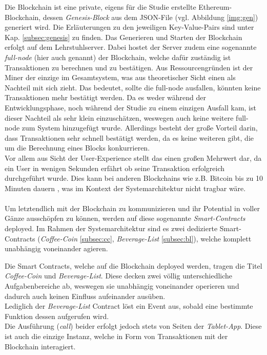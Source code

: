 Die Blockchain ist eine private, eigens für die Studie erstellte Ethereum-Blockchain, dessen \textit{Genesis-Block} aus dem JSON-File (vgl. Abbildung \ref{img:gen}) generiert wird. Die Erläuterungen zu den jeweiligen Key-Value-Pairs sind unter Kap. \ref{subsec:genesis} zu finden.
Das Generieren und Starten der Blockchain erfolgt auf dem Lehrstuhlserver.
Dabei hostet der Server zudem eine sogenannte \textit{full-node} (hier auch  genannt) der Blockchain, welche dafür zuständig ist Transaktionen zu berechnen und zu bestätigen.
Aus Ressourcengründen ist der Miner der einzige im Gesamtsystem, was aus theoretischer Sicht einen  als Nachteil mit sich zieht. Das bedeutet, sollte die full-node ausfallen, könnten keine Transaktionen mehr bestätigt werden. Da es weder während der Entwicklungsphase, noch während der Studie zu einem einzigen Ausfall kam, ist dieser Nachteil als sehr klein einzuschätzen, weswegen auch keine weitere full-node zum System hinzugefügt wurde. Allerdings besteht der große Vorteil darin, dass Transaktionen sehr schnell bestätigt werden, da es keine weiteren  gibt, die um die Berechnung eines Blocks konkurrieren. \\
Vor allem aus Sicht der User-Experience stellt das einen großen Mehrwert dar, da ein User in wenigen Sekunden erfährt ob seine Transaktion erfolgreich durchgeführt wurde. Dies kann bei anderen Blockchains wie z.B. Bitcoin bis zu 10 Minuten dauern \cite{MINING:kryptopedia}, was im Kontext der Systemarchitektur nicht tragbar wäre.\\\\
Um letztendlich mit der Blockchain zu kommunizieren und ihr Potential in voller Gänze ausschöpfen zu können, werden auf diese sogenannte \textit{Smart-Contracts} deployed. Im Rahmen der Systemarchitektur sind es zwei dedizierte Smart-Contracts (\textit{Coffee-Coin} \ref{subsec:cc}, \textit{Beverage-List} \ref{subsec:bl}), welche komplett unabhängig voneinander agieren.


Die Smart Contracts, welche auf die Blockchain deployed werden, tragen die Titel \textit{Coffee-Coin} und \textit{Beverage-List}. Diese decken zwei völlig unterschiedliche Aufgabenbereiche ab, weswegen sie  unabhängig voneinander operieren und dadurch auch keinen Einfluss aufeinander ausüben.\\
Lediglich der \textit{Beverage-List} Contract löst ein Event aus, sobald eine bestimmte Funktion dessen aufgerufen wird. \\
Die Ausführung (\textit{call}) beider erfolgt jedoch stets von Seiten der \textit{Tablet-App}. Diese ist auch die einzige Instanz, welche in Form von Transaktionen mit der Blockchain interagiert.

